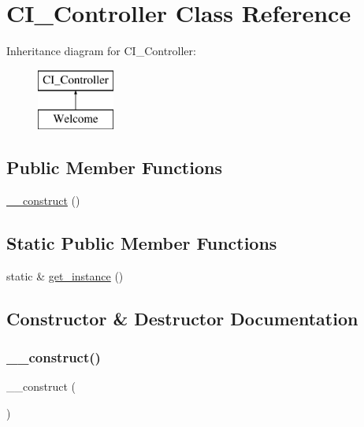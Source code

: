 \hypertarget{class_c_i___controller}{}\section{C\+I\+\_\+\+Controller Class Reference}
\label{class_c_i___controller}
Inheritance diagram for C\+I\+\_\+\+Controller\+:\begin{figure}[H]
\begin{center}
\leavevmode
\includegraphics[height=2.000000cm]{class_c_i___controller}
\end{center}
\end{figure}
\subsection*{Public Member Functions}
\begin{DoxyCompactItemize}
\item 
\mbox{\hyperlink{class_c_i___controller_a095c5d389db211932136b53f25f39685}{\+\_\+\+\_\+construct}} ()
\end{DoxyCompactItemize}
\subsection*{Static Public Member Functions}
\begin{DoxyCompactItemize}
\item 
static \& \mbox{\hyperlink{class_c_i___controller_a8d3cc57e7b6ec94e704712b0f277f5bb}{get\+\_\+instance}} ()
\end{DoxyCompactItemize}


\subsection{Constructor \& Destructor Documentation}
\mbox{\label{class_c_i___controller_a095c5d389db211932136b53f25f39685}} 
\subsubsection{\texorpdfstring{\+\_\+\+\_\+construct()}{\_\_construct()}}
{\footnotesize\ttfamily \+\_\+\+\_\+construct (\begin{DoxyParamCaption}{ }\end{DoxyParamCaption})}

